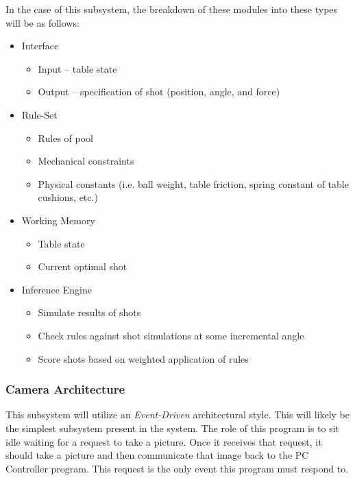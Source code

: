 \documentclass[titlepage]{article}
\begin{document}
In the case of this subsystem, the breakdown of these modules into these types will be as follows:
\begin{itemize}
	\item Interface
	\begin{itemize}
		\item Input -- table state
		\item Output -- specification of shot (position, angle, and force)
	\end{itemize}
	\item Rule-Set
	\begin{itemize}
		\item Rules of pool
		\item Mechanical constraints
		\item Physical constants (i.e. ball weight, table friction, spring constant of table cushions, etc.)
	\end{itemize}
	\item Working Memory
	\begin{itemize}
		\item Table state
		\item Current optimal shot
	\end{itemize}
	\item Inference Engine
	\begin{itemize}
		\item Simulate results of shots
		\item Check rules against shot simulations at some incremental angle
		\item Score shots based on weighted application of rules
	\end{itemize}
\end{itemize}
\subsubsection{Camera Architecture}
This subsystem will utilize an \textit{Event-Driven} architectural style. This will likely be the simplest subsystem present in the system. The role of this program is to sit idle waiting for a request to take a picture. Once it receives that request, it should take a picture and then communicate that image back to the PC Controller program. This request is the only event this program must respond to.
\end{document}
